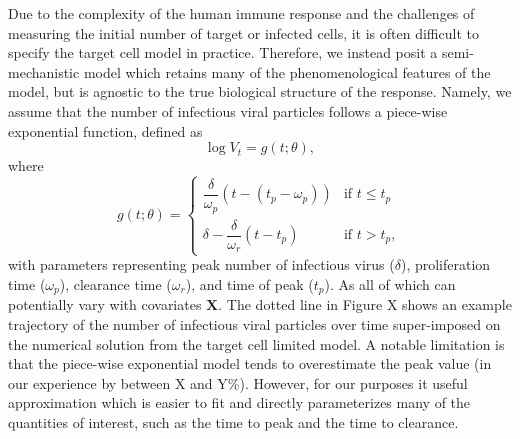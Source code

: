 \documentclass[12pt]{article}
\begin{document}
Due to the complexity of the human immune response and the challenges of measuring the initial number of target or infected cells, it is often difficult to specify the target cell model in practice. Therefore, we instead posit a semi-mechanistic model which retains many of the phenomenological features of the model, but is agnostic to the true biological structure of the response. Namely, we assume that the number of infectious viral particles follows a piece-wise exponential function, defined as
\begin{equation*}
    \log V_t = g(t; \theta),
\end{equation*}
where
\begin{equation*}
    g(t; \theta) = \begin{cases}
   \dfrac{\delta}{\omega_p} (t - (t_p - \omega_p)) & \text{if } t \leq t_p \\
    \delta - \dfrac{\delta}{\omega_r} (t - t_p) & \text{if } t > t_p,
\end{cases}
\end{equation*}
with parameters representing peak number of infectious virus ($\delta$), proliferation time ($\omega_p$), clearance time ($\omega_r$), and time of peak ($t_p$). As all of which can potentially vary with covariates $\mathbf{X}$. The dotted line in Figure X shows an example trajectory of the number of infectious viral particles over time super-imposed on the numerical solution from the target cell limited model. A notable limitation is that the piece-wise exponential model tends to overestimate the peak value (in our experience by between X and Y\%). However, for our purposes it useful approximation which is easier to fit and directly parameterizes many of the quantities of interest, such as the time to peak and the time to clearance.
\end{document}
